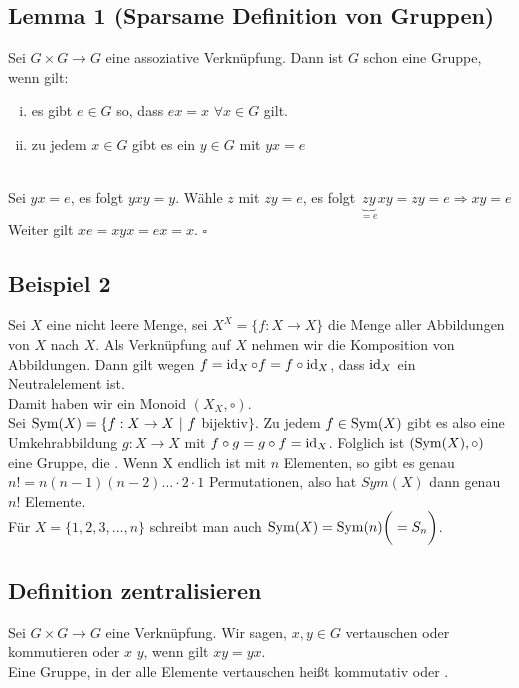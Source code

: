 \subsection{Lemma 1 (Sparsame Definition von Gruppen)}
\label{sub:lemma_1}
Sei $G \times G \to G$ eine assoziative Verknüpfung. Dann ist $G$ schon eine Gruppe, wenn gilt:
\begin{enumerate}[(i)]
	\item es gibt $e \in G$ so, dass $ex=x$ $\forall x \in G$ gilt.
	\item zu jedem $x\in G$ gibt es ein $y \in G$ mit $ yx=e$
\end{enumerate}
\\
Sei $yx=e$, es folgt $yxy=y$. Wähle $z$ mit $zy=e$, es folgt $\underbrace{zy}_{=e}xy=zy=e \Rightarrow xy=e$\\
Weiter gilt $xe=xyx=ex=x$.
\hfill $\square$

\subsection{Beispiel 2}
\label{sub: beispiel_2}
Sei $X$ eine nicht leere Menge, sei $X^X=\{f : X \to X\}$ die Menge aller Abbildungen von $X$ nach $X$. Als Verknüpfung auf $X$ nehmen wir die Komposition von Abbildungen. Dann gilt wegen $f=\operatorname{id}_X \circ f= f \circ \operatorname{id}_X$, dass $\operatorname{id}_X$ ein Neutralelement ist.\\
Damit haben wir ein Monoid $(X_X, \circ )$.\\
Sei $\operatorname{Sym}(X)=\{f:X\to X~|~f$ bijektiv$\}$. Zu jedem $f\in \operatorname{Sym}(X)$ gibt es also eine Umkehrabbildung $g:X\to X$ mit $f \circ g=g\circ f=\operatorname{id}_X$. Folglich ist $(\operatorname{Sym}(X), \circ)$ eine Gruppe, die . Wenn X endlich ist mit $n$ Elementen, so gibt es genau $n!=n(n-1)(n-2)\dots \cdot 2\cdot 1$ Permutationen, also hat $Sym(X)$ dann genau $n!$ Elemente.\\
Für $X=\{1,2,3,\dots,n\}$ schreibt man auch $\operatorname{Sym}(X)=\operatorname{Sym}(n)\bigg( =S_n \bigg)$.

\subsection{Definition zentralisieren}
\label{sub:def_zentralisieren}
Sei $G \times G \to G$ eine Verknüpfung. Wir sagen, $x,y \in G$ vertauschen oder kommutieren oder $x$  $y$, wenn gilt $xy=yx$.\\
Eine Gruppe, in der alle Elemente vertauschen heißt kommutativ oder . 

